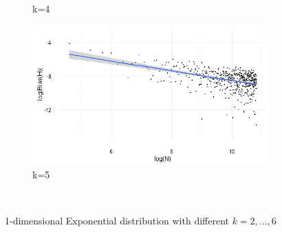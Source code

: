 \documentclass[12pt]{report}
\begin{document}
\begin{figure}
{\begin{subfigure}[b]{.6\textwidth}
\caption{k=4}
\end{subfigure}%
\begin{subfigure}[b]{.6\textwidth}
\centering
\includegraphics[width=\textwidth]{./Graphs/Best/Expo_k=5.png}
\caption{k=5}
\end{subfigure}%
}\    
\caption{1-dimensional Exponential distribution with different $k = 2, ..., 6$} \label{Expo_graphs26}
\end{figure}
\end{document}
